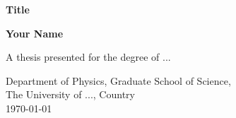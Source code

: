 \begin{titlepage}
    \begin{center}
        \vspace*{1cm}

        \textbf{\LARGE Title}

        \vspace{0.5cm}

        \vspace{1.5cm}

        \textbf{\LARGE Your Name}

        \vfill

        \Large
        A thesis presented for the degree of ...


        Department of Physics, Graduate School of Science,\\
        The University of ..., Country\\
        \today

    \end{center}
 \end{titlepage}
